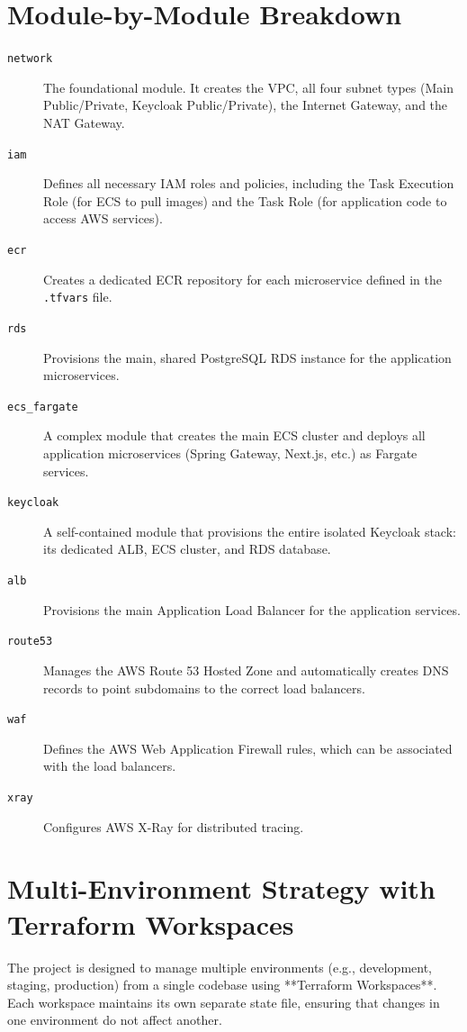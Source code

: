 \documentclass[a4paper,11pt]{article}
\begin{document}
\section{Module-by-Module Breakdown}
\begin{description}
    \item[\texttt{network}] The foundational module. It creates the VPC, all four subnet types (Main Public/Private, Keycloak Public/Private), the Internet Gateway, and the NAT Gateway.
    \item[\texttt{iam}] Defines all necessary IAM roles and policies, including the Task Execution Role (for ECS to pull images) and the Task Role (for application code to access AWS services).
    \item[\texttt{ecr}] Creates a dedicated ECR repository for each microservice defined in the \texttt{.tfvars} file.
    \item[\texttt{rds}] Provisions the main, shared PostgreSQL RDS instance for the application microservices.
    \item[\texttt{ecs\_fargate}] A complex module that creates the main ECS cluster and deploys all application microservices (Spring Gateway, Next.js, etc.) as Fargate services.
    \item[\texttt{keycloak}] A self-contained module that provisions the entire isolated Keycloak stack: its dedicated ALB, ECS cluster, and RDS database.
    \item[\texttt{alb}] Provisions the main Application Load Balancer for the application services.
    \item[\texttt{route53}] Manages the AWS Route 53 Hosted Zone and automatically creates DNS records to point subdomains to the correct load balancers.
    \item[\texttt{waf}] Defines the AWS Web Application Firewall rules, which can be associated with the load balancers.
    \item[\texttt{xray}] Configures AWS X-Ray for distributed tracing.
\end{description}

\section{Multi-Environment Strategy with Terraform Workspaces}
The project is designed to manage multiple environments (e.g., development, staging, production) from a single codebase using **Terraform Workspaces**. Each workspace maintains its own separate state file, ensuring that changes in one environment do not affect another.
\end{document}
